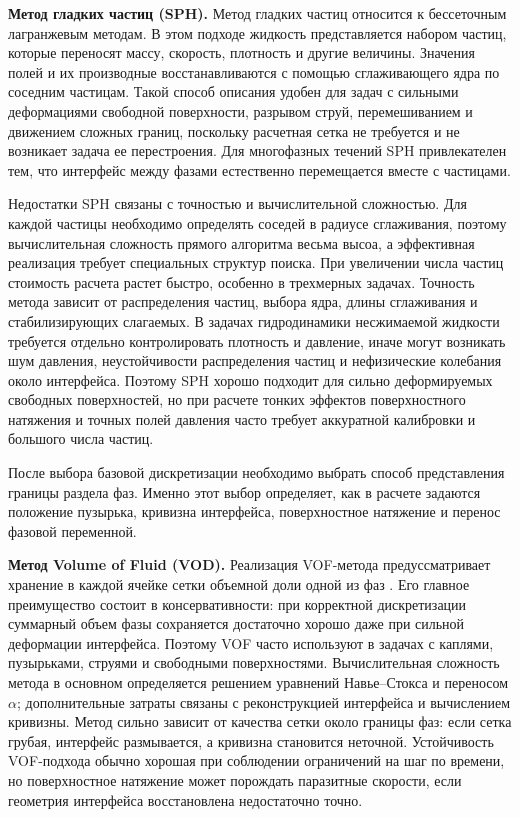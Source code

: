 \documentclass[12pt,a4paper]{article}
\begin{document}
\textbf{Метод гладких частиц (SPH).}
Метод гладких частиц относится к бессеточным лагранжевым
методам. В этом подходе жидкость представляется набором частиц, которые
переносят массу, скорость, плотность и другие величины. Значения полей и их
производные восстанавливаются с помощью сглаживающего ядра по соседним
частицам. Такой способ описания удобен для задач с сильными деформациями
свободной поверхности, разрывом струй, перемешиванием и движением сложных
границ, поскольку расчетная сетка не требуется и не возникает задача ее
перестроения. Для многофазных течений SPH привлекателен тем, что интерфейс
между фазами естественно перемещается вместе с частицами.

Недостатки SPH связаны с точностью и вычислительной сложностью. Для каждой
частицы необходимо определять соседей в радиусе сглаживания, поэтому вычислительная сложность прямого алгоритма весьма высоа, а эффективная реализация требует специальных структур поиска. При
увеличении числа частиц стоимость расчета растет быстро, особенно в трехмерных
задачах. Точность метода зависит от распределения частиц, выбора ядра,
длины сглаживания и стабилизирующих слагаемых. В задачах 
гидродинамики несжимаемой жидкости требуется отдельно контролировать плотность и давление, иначе
могут возникать шум давления, неустойчивости распределения частиц и
нефизические колебания около интерфейса. Поэтому SPH хорошо подходит для
сильно деформируемых свободных поверхностей, но при расчете тонких эффектов
поверхностного натяжения и точных полей давления часто требует аккуратной
калибровки и большого числа частиц.

После выбора базовой дискретизации необходимо выбрать способ представления
границы раздела фаз. Именно этот выбор определяет, как в расчете задаются
положение пузырька, кривизна интерфейса, поверхностное натяжение и перенос
фазовой переменной.

\textbf{Метод Volume of Fluid (VOD).}
Реализация VOF-метода предуссматривает хранение в каждой ячейке сетки объемной доли одной из фаз
\cite{Hirt1981}. Его главное преимущество состоит в консервативности: при
корректной дискретизации суммарный объем фазы сохраняется достаточно хорошо
даже при сильной деформации интерфейса. Поэтому VOF часто используют в задачах
с каплями, пузырьками, струями и свободными поверхностями. Вычислительная
сложность метода в основном определяется решением уравнений Навье--Стокса и
переносом \(\alpha\); дополнительные затраты связаны с реконструкцией
интерфейса и вычислением кривизны. Метод сильно зависит от качества сетки около
границы фаз: если сетка грубая, интерфейс размывается, а кривизна становится
неточной. Устойчивость VOF-подхода обычно хорошая при соблюдении ограничений на
шаг по времени, но поверхностное натяжение может порождать паразитные скорости,
если геометрия интерфейса восстановлена недостаточно точно.
\end{document}
